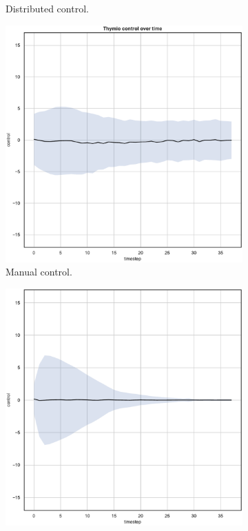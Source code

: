 \begin{figure}[!htb]
\begin{center}
\begin{subfigure}[h]{0.35\textwidth}
			\caption{Distributed control.}
		\end{subfigure}
	\end{center}
	\begin{center}
		\begin{subfigure}[h]{0.35\textwidth}			
			\includegraphics[width=\textwidth]{contents/images/net-d9/control-overtime-manual}%
			\caption{Manual control.}
		\end{subfigure}
		\hspace{1cm}
		\begin{subfigure}[h]{0.35\textwidth}
			\includegraphics[width=\textwidth]{contents/images/net-c9/control-overtime-learned_communication}

\end{subfigure}
\end{center}
\end{figure}

